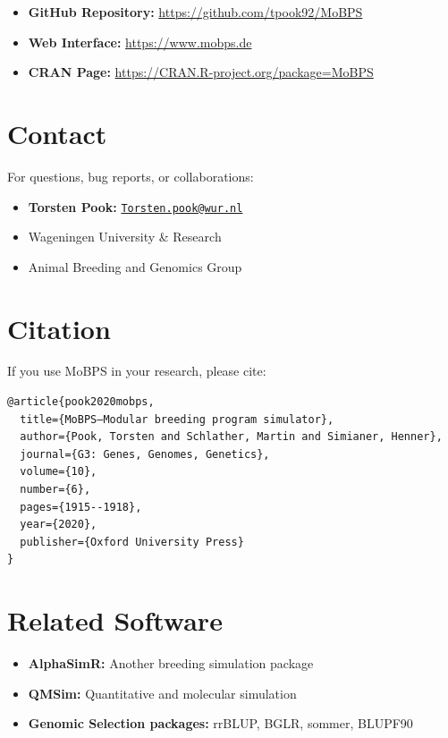 \documentclass[
  letterpaper,
]{book}
\providecommand{\tightlist}{%
  \setlength{\itemsep}{0pt}\setlength{\parskip}{0pt}}
\begin{document}

\begin{itemize}
\tightlist
\item
  \textbf{GitHub Repository:} \url{https://github.com/tpook92/MoBPS}
\item
  \textbf{Web Interface:} \url{https://www.mobps.de}
\item
  \textbf{CRAN Page:} \url{https://CRAN.R-project.org/package=MoBPS}
\end{itemize}

\section*{Contact}\label{contact}


For questions, bug reports, or collaborations:

\begin{itemize}
\tightlist
\item
  \textbf{Torsten Pook:}
  \href{mailto:Torsten.pook@wur.nl}{\nolinkurl{Torsten.pook@wur.nl}}
\item
  Wageningen University \& Research
\item
  Animal Breeding and Genomics Group
\end{itemize}

\section*{Citation}\label{citation}


If you use MoBPS in your research, please cite:

\begin{verbatim}
@article{pook2020mobps,
  title={MoBPS—Modular breeding program simulator},
  author={Pook, Torsten and Schlather, Martin and Simianer, Henner},
  journal={G3: Genes, Genomes, Genetics},
  volume={10},
  number={6},
  pages={1915--1918},
  year={2020},
  publisher={Oxford University Press}
}
\end{verbatim}

\section*{Related Software}\label{related-software}


\begin{itemize}
\tightlist
\item
  \textbf{AlphaSimR:} Another breeding simulation package
\item
  \textbf{QMSim:} Quantitative and molecular simulation
\item
  \textbf{Genomic Selection packages:} rrBLUP, BGLR, sommer, BLUPF90
\end{itemize}


\backmatter
\end{document}
